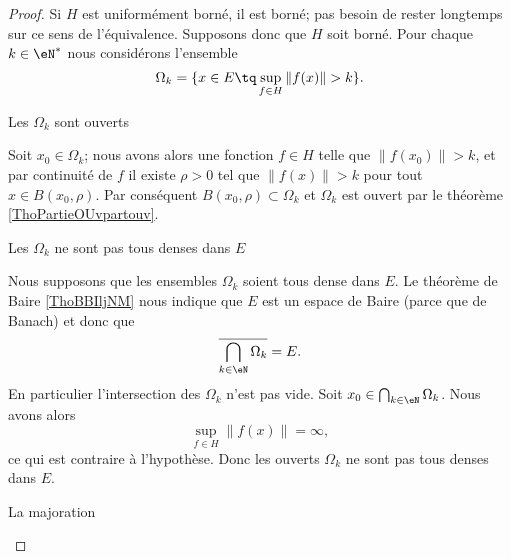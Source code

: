 \begin{proof}
    
    Si \( H\) est uniformément borné, il est borné; pas besoin de rester longtemps sur ce sens de l'équivalence. Supposons donc que \( H\) soit borné. Pour chaque \( k\in \eN^*\) nous considérons l'ensemble
    \begin{equation}
        \Omega_k=\{ x\in E\tq \sup_{f\in H}\| f(x) \|>k \}.
    \end{equation}
    
    \begin{subproof}
        \item[Les \( \Omega_k\) sont ouverts]
            
            Soit \( x_0\in \Omega_k\); nous avons alors une fonction \( f\in H\) telle que \(  \| f(x_0) \|>k \), et par continuité de \( f\) il existe \( \rho>0\) tel que \( \| f(x) \|>k\) pour tout \( x\in B(x_0,\rho)\). Par conséquent \( B(x_0,\rho)\subset \Omega_k\) et \( \Omega_k\) est ouvert par le théorème \ref{ThoPartieOUvpartouv}.

        \item[Les \( \Omega_k\) ne sont pas tous denses dans \( E\)]

            Nous supposons que les ensembles \( \Omega_k\) soient tous dense dans \( E\). Le théorème de Baire \ref{ThoBBIljNM} nous indique que \( E\) est un espace de Baire (parce que de Banach) et donc que 
            \begin{equation}
                \overline{ \bigcap_{k\in \eN}\Omega_k }=E.
            \end{equation}
            En particulier l'intersection des \( \Omega_k\) n'est pas vide. Soit \( x_0\in \bigcap_{k\in \eN}\Omega_k\). Nous avons alors
            \begin{equation}
                \sup_{f\in H}\| f(x) \|=\infty,
            \end{equation}
            ce qui est contraire à l'hypothèse. Donc les ouverts \( \Omega_k\) ne sont pas tous denses dans \(E\).
            
        \item[La majoration]


\end{subproof}
\end{proof}
